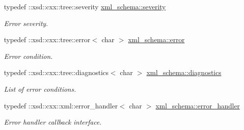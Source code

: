 \begin{DoxyCompactItemize}
typedef \+::xsd\+::cxx\+::tree\+::severity \hyperlink{namespacexml__schema_aaac8e21420b35e58ad94533db40ccf41}{xml\+\_\+schema\+::severity}
\begin{DoxyCompactList}\small\item\em Error severity. \end{DoxyCompactList}\item 
typedef \+::xsd\+::cxx\+::tree\+::error$<$ char $>$ \hyperlink{namespacexml__schema_a13e2122658f2abee3c2da9829f2de129}{xml\+\_\+schema\+::error}
\begin{DoxyCompactList}\small\item\em Error condition. \end{DoxyCompactList}\item 
typedef \+::xsd\+::cxx\+::tree\+::diagnostics$<$ char $>$ \hyperlink{namespacexml__schema_a62cc106990ec99fdaf2f3364d98cfabd}{xml\+\_\+schema\+::diagnostics}
\begin{DoxyCompactList}\small\item\em List of error conditions. \end{DoxyCompactList}\item 
typedef \+::xsd\+::cxx\+::xml\+::error\+\_\+handler$<$ char $>$ \hyperlink{namespacexml__schema_abdee01986b8e16f04af47dd12038261e}{xml\+\_\+schema\+::error\+\_\+handler}
\begin{DoxyCompactList}\small\item\em Error handler callback interface. \end{DoxyCompactList}\end{DoxyCompactItemize}
